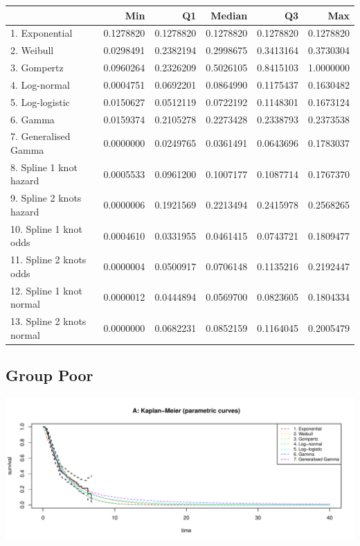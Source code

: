 \documentclass[]{article}
\begin{document}
\begin{tabular}{lrrrrr}
\toprule
  & Min & Q1 & Median & Q3 & Max\\
\midrule
\rowcolor{gray!6}  1. Exponential & 0.1278820 & 0.1278820 & 0.1278820 & 0.1278820 & 0.1278820\\
2. Weibull & 0.0298491 & 0.2382194 & 0.2998675 & 0.3413164 & 0.3730304\\
\rowcolor{gray!6}  3. Gompertz & 0.0960264 & 0.2326209 & 0.5026105 & 0.8415103 & 1.0000000\\
4. Log-normal & 0.0004751 & 0.0692201 & 0.0864990 & 0.1175437 & 0.1630482\\
\rowcolor{gray!6}  5. Log-logistic & 0.0150627 & 0.0512119 & 0.0722192 & 0.1148301 & 0.1673124\\
6. Gamma & 0.0159374 & 0.2105278 & 0.2273428 & 0.2338793 & 0.2373538\\
\rowcolor{gray!6}  7. Generalised Gamma & 0.0000000 & 0.0249765 & 0.0361491 & 0.0643696 & 0.1783037\\
8. Spline 1 knot hazard & 0.0005533 & 0.0961200 & 0.1007177 & 0.1087714 & 0.1767370\\
\rowcolor{gray!6}  9. Spline 2 knots hazard & 0.0000006 & 0.1921569 & 0.2213494 & 0.2415978 & 0.2568265\\
10. Spline 1 knot odds & 0.0004610 & 0.0331955 & 0.0461415 & 0.0743721 & 0.1809477\\
\rowcolor{gray!6}  11. Spline 2 knots odds & 0.0000004 & 0.0500917 & 0.0706148 & 0.1135216 & 0.2192447\\
12. Spline 1 knot normal & 0.0000012 & 0.0444894 & 0.0569700 & 0.0823605 & 0.1804334\\
\rowcolor{gray!6}  13. Spline 2 knots normal & 0.0000000 & 0.0682231 & 0.0852159 & 0.1164045 & 0.2005479\\
\bottomrule
\end{tabular}

\newpage

\subsection{Group Poor}\label{group-poor}

\begin{flushleft}\includegraphics[height=0.29\textheight]{images/validate_extrapolation3-1} \end{flushleft}
\end{document}
